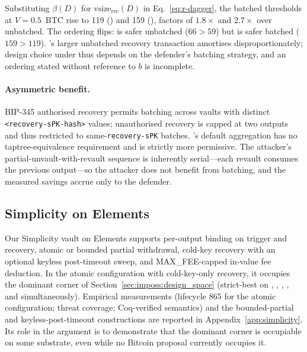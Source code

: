 Substituting $\beta(D)$ for $\text{vsize}_{\text{rec}}(D)$ in
Eq.~\ref{eq:r-dagger}, the batched thresholds at $V = 0.5$~BTC rise
to 119\satvB{} (\opccv{}) and 159\satvB{} (\opvault{}), factors of
$1.8\times$ and $2.7\times$ over unbatched. The ordering flips: \opccv{}
is safer unbatched ($66 > 59$) but \opvault{} is safer batched
($159 > 119$). \opvault{}'s larger unbatched recovery transaction
amortises disproportionately; design choice under \classscale{} thus
depends on the defender's batching strategy, and an ordering stated
without reference to $b$ is incomplete.

\paragraph{Asymmetric benefit.}
BIP-345 authorised recovery permits batching across vaults with
distinct \texttt{<recovery-sPK-hash>} values; unauthorised recovery
is capped at two outputs and thus restricted to
same-\texttt{recovery-sPK} batches. \opccv{}'s default aggregation has no
taptree-equivalence requirement and is strictly more permissive. The
attacker's partial-unvault-with-revault sequence is inherently
serial---each revault consumes the previous output---so the
attacker does not benefit from batching, and the measured savings
accrue only to the defender.

\subsection{Simplicity on Elements}
\label{sec:simplicity-perspective}

Our Simplicity vault on Elements supports per-output binding on
trigger and recovery, atomic or bounded partial withdrawal, cold-key
recovery with an optional keyless post-timeout sweep, and MAX\_FEE-capped
in-value fee deduction. In the atomic configuration with
cold-key-only recovery, it occupies the dominant corner of
Section~\ref{sec:imposs:design_space} (strict-best on \axauth{},
\axrevault{}, \axwdbind{}, \axrecbind{}, and \axintro{}
simultaneously). Empirical measurements (lifecycle 865\vB{} for the
atomic configuration; threat coverage; Coq-verified semantics) and
the bounded-partial and keyless-post-timeout constructions are
reported in Appendix~\ref{app:simplicity}. Its role in the argument
is to demonstrate that the dominant corner is occupiable on some
substrate, even while no Bitcoin proposal currently occupies it.

\providecommand{\todo}[2][]{\textbf{[TODO: #2]}}
